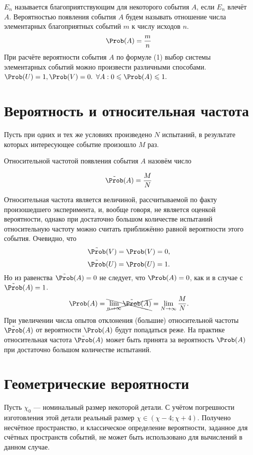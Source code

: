 $E_n$ называется благоприятствующим для некоторого события $A$, если $E_n$ влечёт $A$.
 Вероятностью появления события $A$ будем называть отношение числа элементарных благоприятных событий $m$ к числу исходов $n$.
\begin{equation}
	\Prob (A) = \frac{m}{n} \hfill
\end{equation}
\addition При расчёте вероятности события $A$ по формуле (1) выбор системы элементарных событий можно произвести различными способами.
\conclusion $\Prob(U) = 1, \Prob(V) = 0.$
\conclusion $\forall A: 0 \leqslant \Prob(A) \leqslant 1.$
\section{Вероятность и относительная частота}
\begin{definition}
	Пусть при одних и тех же условиях произведено $N$ испытаний, в результате которых интересующее событие произошло $M$ раз.
\end{definition}

Относительной частотой появления события $A$ назовём число

\begin{equation}
	\tilde{\Prob}(A) = \frac{M}{N}
\end{equation}

Относительная частота является величиной, рассчитываемой по факту произошедшего эксперимента, и, вообще говоря, не является оценкой вероятности, однако при достаточно большом количестве испытаний относительную частоту можно считать приближённо равной вероятности этого события.
Очевидно, что
$$\tilde{\Prob}(V) = \Prob(V) = 0,$$
$$\tilde{\Prob}(U) = \Prob(U) = 1.$$
Но из равенства $\tilde{\Prob}(A) = 0$ не следует, что $\Prob(A) = 0$, как и в случае с  $\tilde{\Prob}(A) = 1$.
\[
	\Prob(A) = \xcancel {\lim_{n\to\infty} \tilde{\Prob}(A)} = \lim_{N\to\infty} \frac{M}{N}.
\]
При увеличении числа опытов отклонения (большие) относительной частоты $\tilde{\Prob}(A)$ от вероятности $\Prob(A)$ будут попадаться реже. На практике относительная частота $\tilde{\Prob}(A)$ может быть принята за вероятность $\Prob(A)$ при достаточно большом количестве испытаний.

\section{Геометрические вероятности}
Пусть $\chi_0$ --- номинальный размер некоторой детали. С учётом погрешности изготовления этой детали реальный размер $\chi \in (\chi - 4; \chi + 4)$. Получено несчётное пространство, и классическое определение вероятности, заданное для счётных пространств событий, не может быть использовано для вычислений в данном случае.

